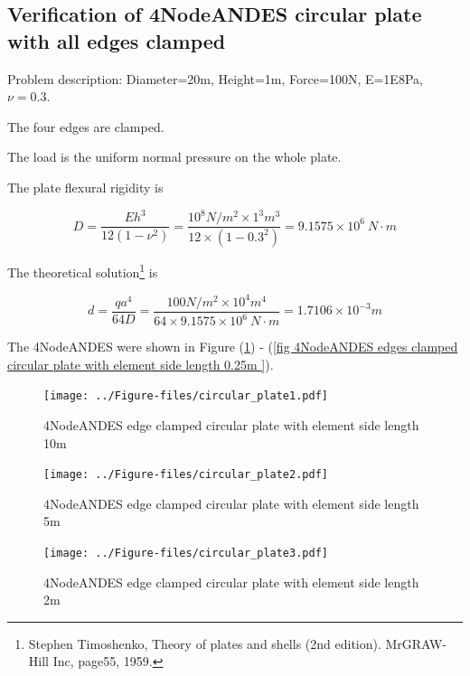 \documentclass[fleqn,11pt]{article}
\begin{document}
\newpage
\subsection{Verification of 4NodeANDES circular plate with all edges clamped}

Problem description: Diameter=20m, Height=1m, Force=100N, E=1E8Pa, $\nu=0.3$. 

The four edges are clamped. 

The load is the uniform normal pressure on the whole plate. 


The plate flexural rigidity is 

\begin{equation}
  D=\frac{Eh^3}{12(1-\nu^2)}=\frac{10^8 N/m^2 \times 1^3 m^3 }{12 \times (1-0.3^2) }= 9.1575 \times 10^6 \ N\cdot m
\end{equation}

The theoretical solution\footnote{Stephen Timoshenko, Theory of plates and shells (2nd edition). MrGRAW-Hill Inc, page55, 1959.} is 

\begin{equation}
  d= \frac{q a^4}{64D}=\frac{100 N/m^2 \times 10^4 m^4}{64 \times 9.1575 \times 10^6 \ N\cdot m}=1.7106\times 10^{-3} m
\end{equation}

The 4NodeANDES were shown in Figure (\ref{fig 4NodeANDES edges clamped circular plate with element side length 10m }) - (\ref{fig 4NodeANDES edges clamped circular plate with element side length 0.25m }). 




\begin{figure}[H]
  \centering
  \texttt{[image: ../Figure-files/circular\_plate1.pdf]}
  \caption{4NodeANDES edge clamped circular plate with element side length 10m }
  \label{fig 4NodeANDES edges clamped circular plate with element side length 10m }
\end{figure}

\newpage

\begin{figure}[H]
  \centering
  \texttt{[image: ../Figure-files/circular\_plate2.pdf]}
  \caption{4NodeANDES edge clamped circular plate with element side length 5m }
  \label{fig 4NodeANDES edges clamped circular plate with element side length 5m }
\end{figure}


\begin{figure}[H]
  \centering
  \texttt{[image: ../Figure-files/circular\_plate3.pdf]}
  \caption{4NodeANDES edge clamped circular plate with element side length 2m }
  \label{fig 4NodeANDES edges clamped circular plate with element side length 2m }
\end{figure}
\end{document}
